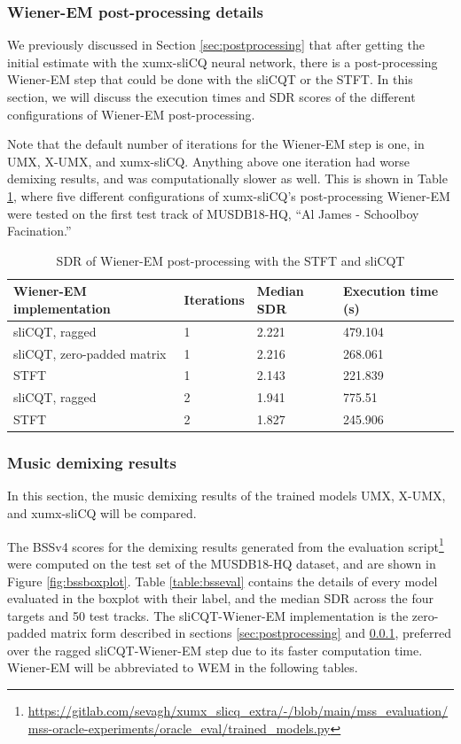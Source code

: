 \documentclass[report.tex]{subfiles}
\begin{document}
\subsubsection{Wiener-EM post-processing details}
\label{sec:wienerconfigs}

We previously discussed in Section \ref{sec:postprocessing} that after getting the initial estimate with the xumx-sliCQ neural network, there is a post-processing Wiener-EM step that could be done with the sliCQT or the STFT. In this section, we will discuss the execution times and SDR scores of the different configurations of Wiener-EM post-processing.

Note that the default number of iterations for the Wiener-EM step is one, in UMX, X-UMX, and xumx-sliCQ. Anything above one iteration had worse demixing results, and was computationally slower as well. This is shown in Table \ref{table:wienerem}, where five different configurations of xumx-sliCQ's post-processing Wiener-EM were tested on the first test track of MUSDB18-HQ, ``Al James - Schoolboy Facination.''

\begin{table}[ht]
	\centering
	\caption{SDR of Wiener-EM post-processing with the STFT and sliCQT}
	\label{table:wienerem}
	\begin{tabular}{ |l|l|l|l| }
	 \hline
		Wiener-EM implementation & Iterations & Median SDR & Execution time (s) \\
	 \hline
	 \hline
		sliCQT, ragged & 1 & 2.221 & 479.104 \\
	 \hline
		sliCQT, zero-padded matrix & 1 & 2.216 & 268.061  \\
	 \hline
		STFT & 1 & 2.143 & 221.839  \\
	 \hline
		sliCQT, ragged & 2 & 1.941 & 775.51  \\
	 \hline
		STFT & 2 & 1.827 & 245.906  \\
	 \hline
\end{tabular}
\end{table}

\subsubsection{Music demixing results}
\label{sec:demixresults}

In this section, the music demixing results of the trained models UMX, X-UMX, and xumx-sliCQ will be compared.

The BSSv4 scores for the demixing results generated from the evaluation script\footnote{\url{https://gitlab.com/sevagh/xumx_slicq_extra/-/blob/main/mss_evaluation/mss-oracle-experiments/oracle_eval/trained_models.py}} were computed on the test set of the MUSDB18-HQ dataset, and are shown in Figure \ref{fig:bssboxplot}. Table \ref{table:bsseval} contains the details of every model evaluated in the boxplot with their label, and the median SDR across the four targets and 50 test tracks. The sliCQT-Wiener-EM implementation is the zero-padded matrix form described in sections \ref{sec:postprocessing} and \ref{sec:wienerconfigs}, preferred over the ragged sliCQT-Wiener-EM step due to its faster computation time. Wiener-EM will be abbreviated to WEM in the following tables.
\end{document}
